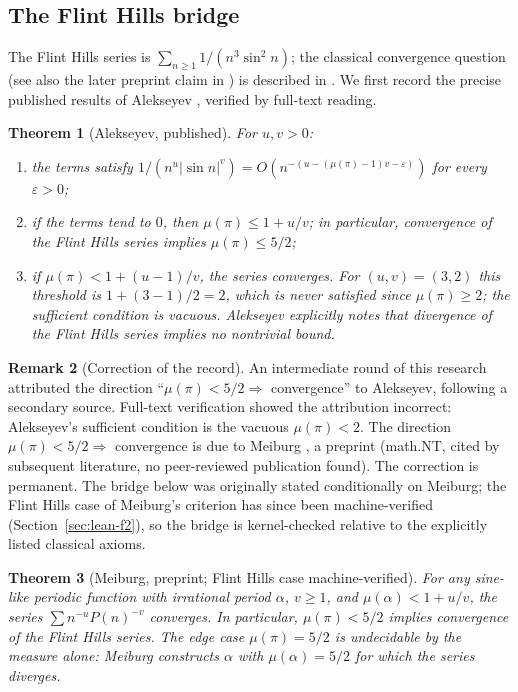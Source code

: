 \documentclass[11pt]{amsart}
\newtheorem{theorem}{Theorem}[section]
\theoremstyle{definition}
\newtheorem{remark}[theorem]{Remark}
\theoremstyle{remark}
\numberwithin{equation}{section}
\newcommand{\irr}{\mu}
\begin{document}
\subsection{The Flint Hills bridge}\label{sec:flint-bridge}

The Flint Hills series is $\sum_{n\ge1}1/(n^3\sin^2n)$; the classical convergence question (see also the later preprint claim in \cite{OpenAI2026}) is described in \cite{MathWorldFlint,FormalConjectures}. We first record the precise published results of Alekseyev \cite{Alekseyev2011}, verified by full-text reading.

\begin{theorem}[Alekseyev, published]\label{thm:alekseyev}
For $u,v>0$:
\begin{enumerate}
\item the terms satisfy $1/(n^u|\sin n|^v)=O(n^{-(u-(\irr(\pi)-1)v-\varepsilon)})$ for every $\varepsilon>0$;
\item if the terms tend to $0$, then $\irr(\pi)\le1+u/v$; in particular, convergence of the Flint Hills series implies $\irr(\pi)\le5/2$;
\item if $\irr(\pi)<1+(u-1)/v$, the series converges. For $(u,v)=(3,2)$ this threshold is $1+(3-1)/2=2$, which is never satisfied since $\irr(\pi)\ge2$; the sufficient condition is vacuous. Alekseyev explicitly notes that divergence of the Flint Hills series implies no nontrivial bound.
\end{enumerate}
\end{theorem}

\begin{remark}[Correction of the record]
An intermediate round of this research attributed the direction ``$\irr(\pi)<5/2\Rightarrow$ convergence'' to Alekseyev, following a secondary source. Full-text verification showed the attribution incorrect: Alekseyev's sufficient condition is the vacuous $\irr(\pi)<2$. The direction $\irr(\pi)<5/2\Rightarrow$ convergence is due to Meiburg \cite{Meiburg2022}, a preprint (math.NT, cited by subsequent literature, no peer-reviewed publication found). The correction is permanent. The bridge below was originally stated conditionally on Meiburg; the Flint Hills case of Meiburg's criterion has since been machine-verified (Section~\ref{sec:lean-f2}), so the bridge is kernel-checked relative to the explicitly listed classical axioms.
\end{remark}

\begin{theorem}[Meiburg, preprint; Flint Hills case machine-verified]\label{thm:meiburg}
For any sine-like periodic function with irrational period $\alpha$, $v\ge1$, and $\irr(\alpha)<1+u/v$, the series $\sum n^{-u}P(n)^{-v}$ converges. In particular, $\irr(\pi)<5/2$ implies convergence of the Flint Hills series. The edge case $\irr(\pi)=5/2$ is undecidable by the measure alone: Meiburg constructs $\alpha$ with $\irr(\alpha)=5/2$ for which the series diverges.
\end{theorem}
\end{document}
